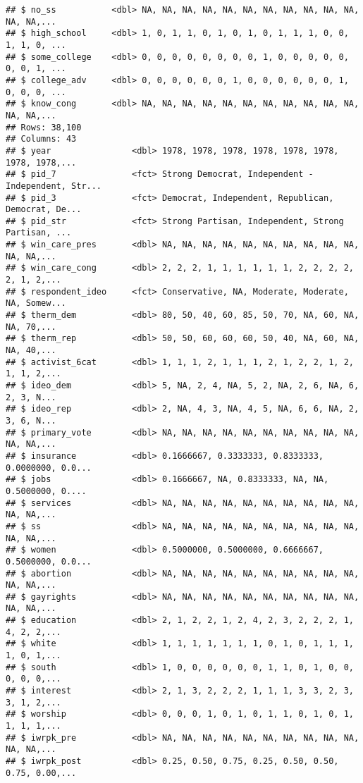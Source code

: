 \documentclass[
]{article}
\begin{document}
\begin{verbatim}
## $ no_ss           <dbl> NA, NA, NA, NA, NA, NA, NA, NA, NA, NA, NA, NA, NA,...
## $ high_school     <dbl> 1, 0, 1, 1, 0, 1, 0, 1, 0, 1, 1, 1, 0, 0, 1, 1, 0, ...
## $ some_college    <dbl> 0, 0, 0, 0, 0, 0, 0, 0, 1, 0, 0, 0, 0, 0, 0, 0, 1, ...
## $ college_adv     <dbl> 0, 0, 0, 0, 0, 0, 1, 0, 0, 0, 0, 0, 0, 1, 0, 0, 0, ...
## $ know_cong       <dbl> NA, NA, NA, NA, NA, NA, NA, NA, NA, NA, NA, NA, NA,...
## Rows: 38,100
## Columns: 43
## $ year                <dbl> 1978, 1978, 1978, 1978, 1978, 1978, 1978, 1978,...
## $ pid_7               <fct> Strong Democrat, Independent - Independent, Str...
## $ pid_3               <fct> Democrat, Independent, Republican, Democrat, De...
## $ pid_str             <fct> Strong Partisan, Independent, Strong Partisan, ...
## $ win_care_pres       <dbl> NA, NA, NA, NA, NA, NA, NA, NA, NA, NA, NA, NA,...
## $ win_care_cong       <dbl> 2, 2, 2, 1, 1, 1, 1, 1, 1, 2, 2, 2, 2, 2, 1, 2,...
## $ respondent_ideo     <fct> Conservative, NA, Moderate, Moderate, NA, Somew...
## $ therm_dem           <dbl> 80, 50, 40, 60, 85, 50, 70, NA, 60, NA, NA, 70,...
## $ therm_rep           <dbl> 50, 50, 60, 60, 60, 50, 40, NA, 60, NA, NA, 40,...
## $ activist_6cat       <dbl> 1, 1, 1, 2, 1, 1, 1, 2, 1, 2, 2, 1, 2, 1, 1, 2,...
## $ ideo_dem            <dbl> 5, NA, 2, 4, NA, 5, 2, NA, 2, 6, NA, 6, 2, 3, N...
## $ ideo_rep            <dbl> 2, NA, 4, 3, NA, 4, 5, NA, 6, 6, NA, 2, 3, 6, N...
## $ primary_vote        <dbl> NA, NA, NA, NA, NA, NA, NA, NA, NA, NA, NA, NA,...
## $ insurance           <dbl> 0.1666667, 0.3333333, 0.8333333, 0.0000000, 0.0...
## $ jobs                <dbl> 0.1666667, NA, 0.8333333, NA, NA, 0.5000000, 0....
## $ services            <dbl> NA, NA, NA, NA, NA, NA, NA, NA, NA, NA, NA, NA,...
## $ ss                  <dbl> NA, NA, NA, NA, NA, NA, NA, NA, NA, NA, NA, NA,...
## $ women               <dbl> 0.5000000, 0.5000000, 0.6666667, 0.5000000, 0.0...
## $ abortion            <dbl> NA, NA, NA, NA, NA, NA, NA, NA, NA, NA, NA, NA,...
## $ gayrights           <dbl> NA, NA, NA, NA, NA, NA, NA, NA, NA, NA, NA, NA,...
## $ education           <dbl> 2, 1, 2, 2, 1, 2, 4, 2, 3, 2, 2, 2, 1, 4, 2, 2,...
## $ white               <dbl> 1, 1, 1, 1, 1, 1, 1, 0, 1, 0, 1, 1, 1, 1, 0, 1,...
## $ south               <dbl> 1, 0, 0, 0, 0, 0, 0, 1, 1, 0, 1, 0, 0, 0, 0, 0,...
## $ interest            <dbl> 2, 1, 3, 2, 2, 2, 1, 1, 1, 3, 3, 2, 3, 3, 1, 2,...
## $ worship             <dbl> 0, 0, 0, 1, 0, 1, 0, 1, 1, 0, 1, 0, 1, 1, 1, 1,...
## $ iwrpk_pre           <dbl> NA, NA, NA, NA, NA, NA, NA, NA, NA, NA, NA, NA,...
## $ iwrpk_post          <dbl> 0.25, 0.50, 0.75, 0.25, 0.50, 0.50, 0.75, 0.00,...

\end{verbatim}
\end{document}
